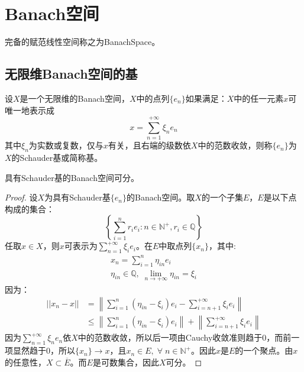 \section{Banach空间}

\begin{definition}
	完备的赋范线性空间称之为\gls{BanachSpace}。
\end{definition}
\subsection{无限维Banach空间的基}
\begin{definition}
	设$X$是一个无限维的Banach空间，$X$中的点列$\{e_n\}$如果满足：$X$中的任一元素$x$可唯一地表示成
	\begin{equation*}
		x=\sum_{n=1}^{+\infty}\xi_ne_n
	\end{equation*}
	其中$\xi_n$为实数或复数，仅与$x$有关，且右端的级数依$X$中的范数收敛，则称$\{e_n\}$为$X$的Schauder基或简称基。
\end{definition}
\begin{theorem}
	具有Schauder基的Banach空间可分。
\end{theorem}
\begin{proof}
	设$X$为具有Schauder基$\{e_n\}$的Banach空间。取$X$的一个子集$E$，$E$是以下点构成的集合：
	\begin{equation*}
		\left\{\sum_{i=1}^nr_ie_i:n\in\mathbb{N}^+,r_i\in\mathbb{Q}\right\}
	\end{equation*}
	任取$x\in X$，则$x$可表示为$\sum\limits_{n=1}^{+\infty}\xi_ie_i$。在$E$中取点列$\{x_n\}$，其中:
	\begin{gather*}
		x_n=\sum_{i=1}^{n}\eta_{in}e_i \\
		\eta_{in}\in\mathbb{Q},\;\lim_{n\to+\infty}\eta_{in}=\xi_i
	\end{gather*}
	因为：
	\begin{align*}
		||x_n-x||
		&=\left\|\sum_{i=1}^{n}(\eta_{in}-\xi_i)e_i-\sum_{i=n+1}^{+\infty}\xi_ie_i\right\| \\
		&\leqslant\left\|\sum_{i=1}^{n}(\eta_{in}-\xi_i)e_i\right\|+\left\|\sum_{i=n+1}^{+\infty}\xi_ie_i\right\|
	\end{align*}
	因为$\sum\limits_{n=1}^{+\infty}\xi_ne_n$依$X$中的范数收敛，所以后一项由Cauchy收敛准则趋于$0$，而前一项显然趋于$0$，所以$\{x_n\}\rightarrow x$，且$x_n\in E,\;\forall\;n\in\mathbb{N}^+$。因此$x$是$E$的一个聚点。由$x$的任意性，$X\subset\overline{E}$。而$E$是可数集合，因此$X$可分。
\end{proof}